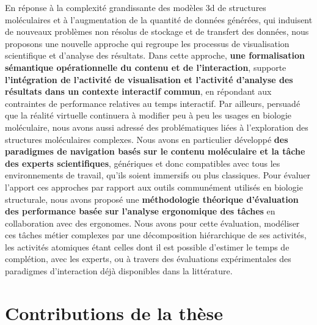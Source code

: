 


\mtcaddchapter

\mtcaddpart


En réponse à la complexité grandissante des modèles 3d de structures moléculaires et à l'augmentation de la quantité de données générées, qui induisent de nouveaux problèmes non résolus de stockage et de transfert des données, nous proposons une nouvelle approche qui regroupe les processus de visualisation scientifique et d'analyse des résultats. Dans cette approche, \textbf{une formalisation sémantique opérationnelle du contenu et de l'interaction}, supporte \textbf{l'intégration de l'activité de visualisation et l'activité d'analyse des résultats dans un contexte interactif commun}, en répondant aux contraintes de performance relatives au temps interactif. Par ailleurs, persuadé que la réalité virtuelle continuera à modifier peu à peu les usages en biologie moléculaire, nous avons aussi adressé des problématiques liées à l'exploration des structures moléculaires complexes. Nous avons en particulier développé \textbf{des paradigmes de navigation basés sur le contenu moléculaire et la tâche des experts scientifiques}, génériques et donc compatibles avec tous les environnements de travail, qu'ils soient immersifs ou plus classiques. Pour évaluer l'apport ces approches par rapport aux outils communément utilisés en biologie structurale, nous avons proposé une \textbf{méthodologie théorique d'évaluation des performance basée sur l'analyse ergonomique des tâches} en collaboration avec des ergonomes. Nous avons pour cette évaluation, modéliser ces tâches métier complexes par une décomposition hiérarchique de ses activités, les activités atomiques étant celles dont il est possible d'estimer le temps de complétion, avec les experts, ou à travers des évaluations expérimentales des paradigmes d'interaction déjà disponibles dans la littérature.

\section*{Contributions de la thèse}


